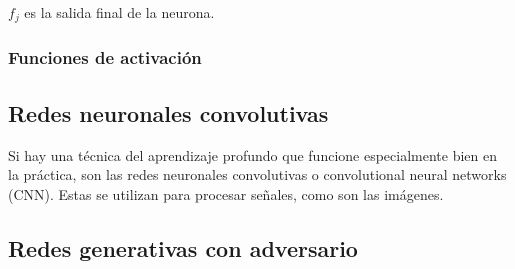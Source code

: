\noindent $f_j$ es la salida final de la neurona.

\subsubsection*{Funciones de activación}

\subsection*{Redes neuronales convolutivas}
Si hay una técnica del aprendizaje profundo que funcione especialmente bien en la práctica, son las redes neuronales convolutivas o convolutional neural networks (CNN). Estas se utilizan para procesar señales, como son las imágenes.

\subsection*{Redes generativas con adversario}
